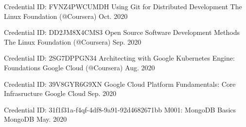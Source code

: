 \begin{cventries}
  \cventry
  {Credential ID: FVNZ4PWCUMDH}
  {Using Git for Distributed Development} %
  {The Linux Foundation (@Coursera)} %
  {Oct. 2020} %
  {
  }

  \cventry
  {Credential ID: DD2JM8X4CMS3}
  {Open Source Software Development Methods} %
  {The Linux Foundation (@Coursera)} %
  {Sep. 2020} %
  {
  }

  \cventry
  {Credential ID: 2SG7DPPGN34}
  {Architecting with Google Kubernetes Engine: Foundations} %
  {Google Cloud (@Coursera)} %
  {Aug. 2020} %
  {
  }

  \cventry
  {Credential ID: 39V8GYR6G9XN}
  {Google Cloud Platform Fundamentals: Core Infrasructure} %
  {Google Cloud} %
  {Sep. 2020} %
  {
  }

  \cventry
  {Credential ID: 31f1f31a-f4qf-4df8-9a91-92d4682671bb}
  {M001: MongoDB Basics} %
  {MongoDB} %
  {May. 2020} %
  {
  }

\end{cventries}

